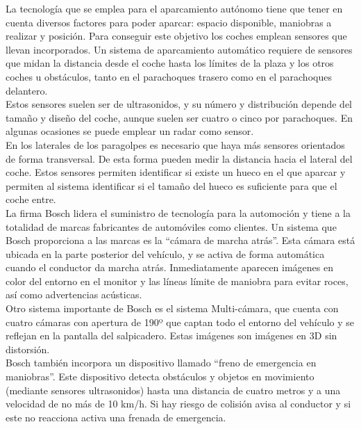 La tecnología que se emplea para el aparcamiento autónomo tiene que tener en cuenta diversos factores para poder aparcar: espacio disponible, maniobras a realizar y posición. Para conseguir este objetivo los coches emplean sensores que llevan incorporados. Un sistema de aparcamiento automático requiere de sensores que midan la distancia desde el coche hasta los límites de la plaza y los otros coches u obstáculos, tanto en el parachoques trasero como en el parachoques delantero.\\

Estos sensores suelen ser de ultrasonidos, y su número y distribución depende del tamaño y diseño del coche, aunque suelen ser cuatro o cinco por parachoques. En algunas ocasiones se puede emplear un radar como sensor.\\

En los laterales de los paragolpes es necesario que haya más sensores orientados de forma transversal. De esta forma pueden medir la distancia hacia el lateral del coche. Estos sensores permiten identificar si existe un hueco en el que aparcar y permiten al sistema identificar si el tamaño del hueco es suficiente para que el coche entre.\\

La firma Bosch lidera el suministro de tecnología para la automoción y tiene a la totalidad de marcas fabricantes de automóviles como clientes. Un sistema que Bosch proporciona a las marcas es la ``cámara de marcha atrás''. Esta cámara está ubicada en la parte posterior del vehículo, y se activa de forma automática cuando el conductor da marcha atrás. Inmediatamente aparecen imágenes en color del entorno en el monitor y las líneas límite de maniobra para evitar roces, así como advertencias acústicas.\\

Otro sistema importante de Bosch es el sistema Multi-cámara, que cuenta con cuatro cámaras con apertura de 190º que captan todo el entorno del vehículo y se reflejan en la pantalla del salpicadero. Estas imágenes son imágenes en 3D sin distorsión.\\

Bosch también incorpora un dispositivo llamado ``freno de emergencia en maniobras''. Este dispositivo detecta obstáculos y objetos en movimiento (mediante sensores ultrasonidos) hasta una distancia de cuatro metros y a una velocidad de no más de 10 km/h. Si hay riesgo de colisión avisa al conductor y si este no reacciona activa una frenada de emergencia.\\

